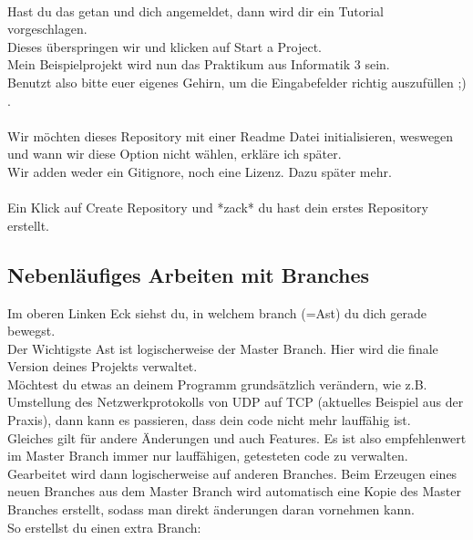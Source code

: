 \documentclass[a4paper,10pt,DIV11,oneside]{scrartcl}
\begin{document}
\\

Hast du das getan und dich angemeldet, dann wird dir ein Tutorial vorgeschlagen. \\
Dieses überspringen wir und klicken auf Start a Project.\\
Mein Beispielprojekt wird nun das Praktikum aus Informatik 3 sein.\\
Benutzt also bitte euer eigenes Gehirn, um die Eingabefelder richtig auszufüllen ;) .\\

\\

Wir möchten dieses Repository mit einer Readme Datei initialisieren, weswegen und wann wir diese Option nicht wählen, erkläre ich später.\\
Wir adden weder ein Gitignore, noch eine Lizenz. Dazu später mehr.\\\\
Ein Klick auf Create Repository und *zack* du hast dein erstes Repository erstellt.



\subsection{Nebenläufiges Arbeiten mit Branches}
Im oberen Linken Eck siehst du, in welchem branch (=Ast) du dich gerade bewegst.\\
Der Wichtigste Ast ist logischerweise der Master Branch. Hier wird die finale Version deines Projekts verwaltet.\\
Möchtest du etwas an deinem Programm grundsätzlich verändern, wie z.B. Umstellung des Netzwerkprotokolls von UDP auf TCP (aktuelles Beispiel aus der Praxis), dann kann es passieren, dass dein code nicht mehr lauffähig ist.\\
Gleiches gilt für andere Änderungen und auch Features. Es ist also empfehlenwert im Master Branch immer nur lauffähigen, getesteten code zu verwalten.\\
Gearbeitet wird dann logischerweise auf anderen Branches. Beim Erzeugen eines neuen Branches aus dem Master Branch wird automatisch eine Kopie des Master Branches erstellt, sodass man direkt änderungen daran vornehmen kann.\\
So erstellst du einen extra Branch:\\
\end{document}
